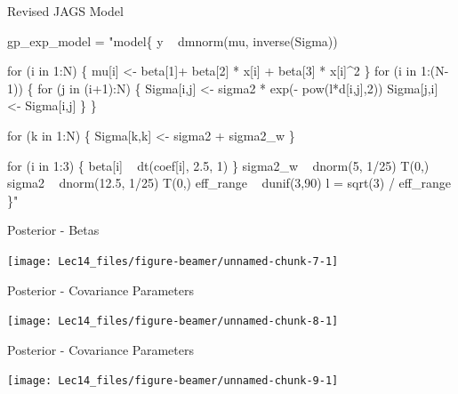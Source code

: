 \documentclass[11pt,ignorenonframetext,]{beamer}
\newenvironment{Shaded}{}{}
\newcommand{\NormalTok}[1]{#1}
\newcommand{\StringTok}[1]{\textcolor[rgb]{0.25,0.44,0.63}{#1}}
\let\oldShaded\Shaded
\let\endoldShaded\endShaded
\renewenvironment{Shaded}{\footnotesize\begin{spacing}{0.9}\oldShaded}{\endoldShaded\end{spacing}}
\let\oldverbatim\verbatim
\let\endoldverbatim\endverbatim
\newcommand{\scriptoutput}{
  \renewenvironment{Shaded}{\scriptsize\begin{spacing}{0.9}\oldShaded}{\endoldShaded\end{spacing}}
  \renewenvironment{verbatim}{\scriptsize\begin{spacing}{0.9}\oldverbatim}{\endoldverbatim\end{spacing}}
}
\begin{document}
\begin{frame}[fragile]{Revised JAGS Model}
\protect\hypertarget{revised-jags-model}{}

\scriptoutput

\begin{Shaded}
\begin{Highlighting}[]
\NormalTok{gp_exp_model =}\StringTok{ "model\{}
\StringTok{  y ~ dmnorm(mu, inverse(Sigma))}

\StringTok{  for (i in 1:N) \{}
\StringTok{    mu[i] <- beta[1]+ beta[2] * x[i] + beta[3] * x[i]^2}
\StringTok{  \}}
\StringTok{  }
\StringTok{  for (i in 1:(N-1)) \{}
\StringTok{    for (j in (i+1):N) \{}
\StringTok{      Sigma[i,j] <- sigma2 * exp(- pow(l*d[i,j],2))}
\StringTok{      Sigma[j,i] <- Sigma[i,j]}
\StringTok{    \}}
\StringTok{  \}}

\StringTok{  for (k in 1:N) \{}
\StringTok{    Sigma[k,k] <- sigma2 + sigma2_w}
\StringTok{  \}}

\StringTok{  for (i in 1:3) \{}
\StringTok{    beta[i] ~ dt(coef[i], 2.5, 1)}
\StringTok{  \}}
\StringTok{  sigma2_w ~ dnorm(5, 1/25) T(0,)}
\StringTok{  sigma2   ~ dnorm(12.5, 1/25) T(0,)}
\StringTok{  }
\StringTok{  eff_range ~ dunif(3,90)}
\StringTok{  l = sqrt(3) / eff_range}
\StringTok{\}"}
\end{Highlighting}
\end{Shaded}

\end{frame}

\begin{frame}{Posterior - Betas}
\protect\hypertarget{posterior---betas}{}

\begin{center}\texttt{[image: Lec14\_files/figure-beamer/unnamed-chunk-7-1]} \end{center}

\end{frame}

\begin{frame}{Posterior - Covariance Parameters}
\protect\hypertarget{posterior---covariance-parameters}{}

\begin{center}\texttt{[image: Lec14\_files/figure-beamer/unnamed-chunk-8-1]} \end{center}

\end{frame}

\begin{frame}{Posterior - Covariance Parameters}
\protect\hypertarget{posterior---covariance-parameters-1}{}

\begin{center}\texttt{[image: Lec14\_files/figure-beamer/unnamed-chunk-9-1]} \end{center}

\end{frame}
\end{document}
